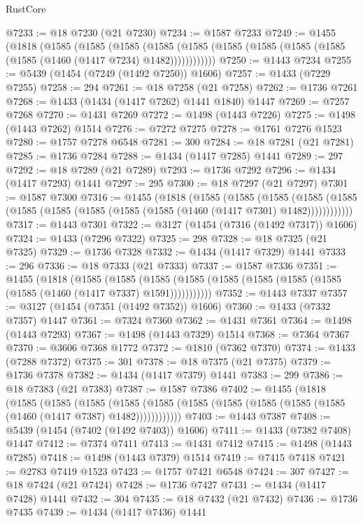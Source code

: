 \begin{lexlean}{RustCore}
\begin{coremodule}
@7233 := @18 @7230 (@21 @7230)
@7234 := @1587 @7233
@7249 := @1455
    (@1818
      (@1585
        (@1585
          (@1585
            (@1585 (@1585 (@1585 (@1585 (@1585 (@1585 (@1585 (@1460 (@1417 @7234) @1482))))))))))))
@7250 := @1443 @7234
@7255 := @5439 (@1454 (@7249 (@1492 @7250)) @1606)
@7257 := @1433 (@7229 @7255)
@7258 := 294
@7261 := @18 @7258 (@21 @7258)
@7262 := @1736 @7261
@7268 := @1433 (@1434 (@1417 @7262) @1441 @1840) @1447
@7269 := @7257 @7268
@7270 := @1431 @7269
@7272 := @1498 (@1443 @7226)
@7275 := @1498 (@1443 @7262) @1514
@7276 := @7272 @7275
@7278 := @1761 @7276 @1523
@7280 := @1757 @7278 @6548
@7281 := 300
@7284 := @18 @7281 (@21 @7281)
@7285 := @1736 @7284
@7288 := @1434 (@1417 @7285) @1441
@7289 := 297
@7292 := @18 @7289 (@21 @7289)
@7293 := @1736 @7292
@7296 := @1434 (@1417 @7293) @1441
@7297 := 295
@7300 := @18 @7297 (@21 @7297)
@7301 := @1587 @7300
@7316 := @1455
    (@1818
      (@1585
        (@1585
          (@1585
            (@1585 (@1585 (@1585 (@1585 (@1585 (@1585 (@1585 (@1460 (@1417 @7301) @1482))))))))))))
@7317 := @1443 @7301
@7322 := @3127 (@1454 (@7316 (@1492 @7317)) @1606)
@7324 := @1433 (@7296 @7322)
@7325 := 298
@7328 := @18 @7325 (@21 @7325)
@7329 := @1736 @7328
@7332 := @1434 (@1417 @7329) @1441
@7333 := 296
@7336 := @18 @7333 (@21 @7333)
@7337 := @1587 @7336
@7351 := @1455
    (@1818
      (@1585
        (@1585
          (@1585 (@1585 (@1585 (@1585 (@1585 (@1585 (@1585 (@1460 (@1417 @7337) @1591)))))))))))
@7352 := @1443 @7337
@7357 := @3127 (@1454 (@7351 (@1492 @7352)) @1606)
@7360 := @1433 (@7332 @7357) @1447
@7361 := @7324 @7360
@7362 := @1431 @7361
@7364 := @1498 (@1443 @7293)
@7367 := @1498 (@1443 @7329) @1514
@7368 := @7364 @7367
@7370 := @3606 @7368 @1772
@7372 := @1810 (@7362 @7370)
@7374 := @1433 (@7288 @7372)
@7375 := 301
@7378 := @18 @7375 (@21 @7375)
@7379 := @1736 @7378
@7382 := @1434 (@1417 @7379) @1441
@7383 := 299
@7386 := @18 @7383 (@21 @7383)
@7387 := @1587 @7386
@7402 := @1455
    (@1818
      (@1585
        (@1585
          (@1585
            (@1585 (@1585 (@1585 (@1585 (@1585 (@1585 (@1585 (@1460 (@1417 @7387) @1482))))))))))))
@7403 := @1443 @7387
@7408 := @5439 (@1454 (@7402 (@1492 @7403)) @1606)
@7411 := @1433 (@7382 @7408) @1447
@7412 := @7374 @7411
@7413 := @1431 @7412
@7415 := @1498 (@1443 @7285)
@7418 := @1498 (@1443 @7379) @1514
@7419 := @7415 @7418
@7421 := @2783 @7419 @1523
@7423 := @1757 @7421 @6548
@7424 := 307
@7427 := @18 @7424 (@21 @7424)
@7428 := @1736 @7427
@7431 := @1434 (@1417 @7428) @1441
@7432 := 304
@7435 := @18 @7432 (@21 @7432)
@7436 := @1736 @7435
@7439 := @1434 (@1417 @7436) @1441

\end{coremodule}
\end{lexlean}
